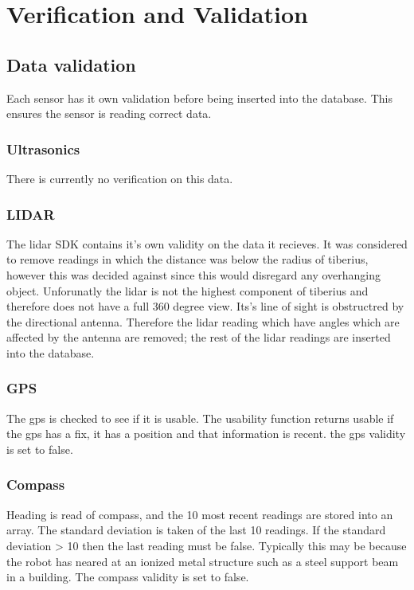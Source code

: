 \section{Verification and Validation}

\subsection{Data validation}
Each sensor has it own validation before being inserted into the database. This ensures the sensor is reading correct data.

\subsubsection{Ultrasonics}
There is currently no verification on this data.

\subsubsection{LIDAR}
The lidar SDK contains it's own validity on the data it recieves. It was considered to remove readings in which the distance was below the radius of tiberius, however this was decided against since this would disregard any overhanging object. 
\newline
Unforunatly the lidar is not the highest component of tiberius and therefore does not have a full 360 degree view. Its's line of sight is obstructred by the directional antenna. Therefore the lidar reading which have angles which are affected by the antenna are removed; the rest of the lidar readings are inserted into the database. 

\subsubsection{GPS}
The gps is checked to see if it is usable. 
The usability function returns usable  if the gps has a fix, it has a position and that information is recent. 
the gps validity is set to false.

\subsubsection{Compass}
Heading is read of compass, and the 10 most recent readings are stored into an array. 
The standard deviation is taken of the last 10 readings. 
If the standard deviation > 10 then the last reading must be false. Typically this may be because the robot has neared at an ionized metal structure such as a steel support beam in a building. 
The compass validity is set to false.



